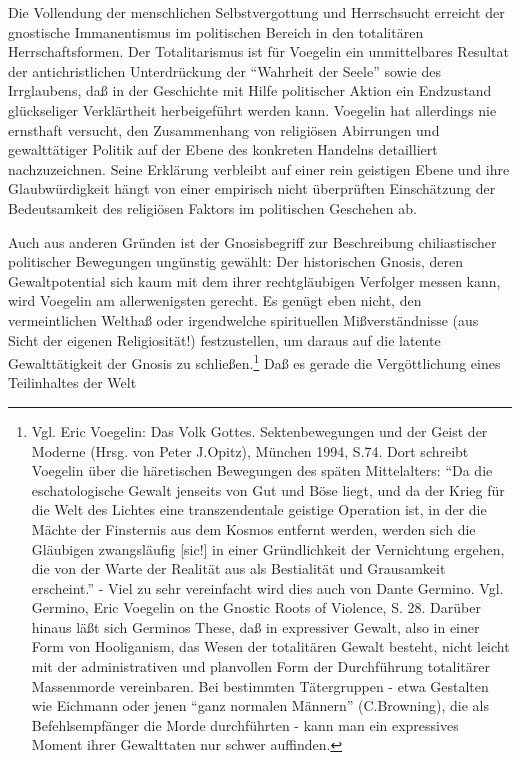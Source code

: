 Die Vollendung der menschlichen Selbstvergottung und Herrschsucht erreicht der
gnostische Immanentismus im politischen Bereich in den totalitären
Herrschaftsformen. Der Totalitarismus ist für Voegelin ein unmittelbares
Resultat der antichristlichen Unterdrückung der "`Wahrheit der Seele"' sowie
des Irrglaubens, daß in der Geschichte mit Hilfe politischer Aktion ein
Endzustand glückseliger Verklärtheit herbeigeführt werden kann. Voegelin hat
allerdings nie ernsthaft versucht, den Zusammenhang von religiösen Abirrungen
und gewalttätiger Politik auf der Ebene des konkreten Handelns detailliert
nachzuzeichnen. Seine Erklärung verbleibt auf einer rein geistigen Ebene und
ihre Glaubwürdigkeit hängt von einer empirisch nicht überprüften Einschätzung
der Bedeutsamkeit des religiösen Faktors im politischen Geschehen ab.

Auch aus anderen Gründen ist der Gnosisbegriff zur Beschreibung chiliastischer
politischer Bewegungen ungünstig gewählt: Der historischen Gnosis, deren
Gewaltpotential sich kaum mit dem ihrer rechtgläubigen Verfolger messen kann,
wird Voegelin am allerwenigsten gerecht. Es genügt eben nicht, den
vermeintlichen Welthaß oder irgendwelche spirituellen Mißverständnisse (aus
Sicht der eigenen Religiosität!) festzustellen, um daraus auf die latente
Gewalttätigkeit der Gnosis zu schließen.\footnote{Vgl. Eric Voegelin: Das Volk
  Gottes. Sektenbewegungen und der Geist der Moderne (Hrsg. von Peter
  J.Opitz), München 1994, S.74. Dort schreibt Voegelin über die häretischen
  Bewegungen des späten Mittelalters: "`Da die eschatologische Gewalt jenseits
  von Gut und Böse liegt, und da der Krieg für die Welt des Lichtes eine
  transzendentale geistige Operation ist, in der die Mächte der Finsternis aus
  dem Kosmos entfernt werden, werden sich die Gläubigen zwangsläufig [sic!]
  in einer Gründlichkeit der Vernichtung ergehen, die von der Warte der
  Realität aus als Bestialität und Grausamkeit erscheint."' - Viel zu sehr
  vereinfacht wird dies auch von Dante Germino. Vgl. Germino, Eric Voegelin on
  the Gnostic Roots of Violence, S. 28. Darüber hinaus läßt sich Germinos
  These, daß in expressiver Gewalt, also in einer Form von Hooliganism, das
  Wesen der totalitären Gewalt besteht, nicht leicht mit der administrativen
  und planvollen Form der Durchführung totalitärer Massenmorde vereinbaren.
  Bei bestimmten Tätergruppen - etwa Gestalten wie Eichmann oder jenen "`ganz
  normalen Männern"' (C.Browning), die als Befehlsempfänger die Morde
  durchführten - kann man ein expressives Moment ihrer Gewalttaten nur schwer
  auf\/finden.} Daß es gerade die Vergöttlichung eines Teilinhaltes der Welt

